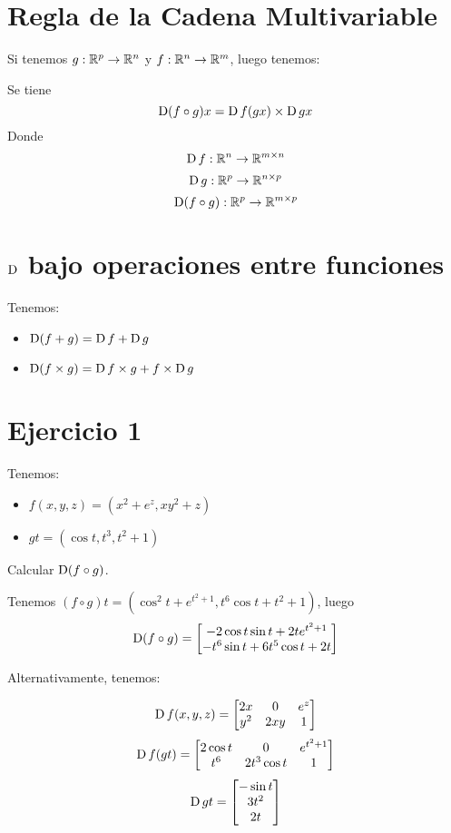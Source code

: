 \documentclass{article}
\begin{document}
\section*{Regla de la Cadena Multivariable}
Si tenemos $g : \mathbb{R}^p \to \mathbb{R}^n$ y $f : \mathbb{R}^n \to \mathbb{R}^m$, luego tenemos:


Se tiene
\[\operatorname{D} (f \circ g) x = \operatorname{D} f (gx) \times \operatorname{D} gx\]
Donde 
\[\operatorname{D} f : \mathbb{R}^n \to \mathbb{R}^{m \times n}\]
\[\operatorname{D} g : \mathbb{R}^p \to \mathbb{R}^{n \times p}\]
\[\operatorname{D} (f \circ g) : \mathbb{R}^p \to \mathbb{R}^{m \times p}\]
\section*{$\operatorname{D}$ bajo operaciones entre funciones}
Tenemos:
\begin{itemize}
	\item $\operatorname{D}(f+g) = \operatorname{D} f + \operatorname{D} g$
	\item $\operatorname{D}(f \times g) = \operatorname{D} f \times g + f \times \operatorname{D} g$
\end{itemize}

\section*{Ejercicio 1}
Tenemos:
\begin{itemize}
	\item $f(x,y,z) = (x^2+e^z, xy^2+z)$
	\item $gt = (\cos t, t^3, t^2+1)$
\end{itemize}
Calcular $\operatorname{D} (f \circ g)$.

Tenemos $(f \circ g)t = (\cos^2t + e^{t^2+1}, t^6\cos t + t^2 + 1)$, luego 
\[\operatorname{D} (f \circ g) = 
\begin{bmatrix}
	-2 \cos t \sin t + 2te^{t^2+1} \\
	-t^6 \sin t +6t^5 \cos t + 2t \\
\end{bmatrix}
\]

Alternativamente, tenemos:

\[
	\operatorname{D} f (x,y,z) = 
\begin{bmatrix}
	2x & 0 & e^z \\
	y^2 & 2xy & 1
\end{bmatrix}
\]
\[
	\operatorname{D} f(gt) = 
	\begin{bmatrix}
		2\cos t & 0 & e^{t^2+1} \\
		t^6 & 2t^3 \cos t & 1
	\end{bmatrix}
\]
\[
	\operatorname{D} gt = 
\begin{bmatrix}
	-\sin t \\
	3t^2 \\
	2t
\end{bmatrix}
\]
\end{document}
